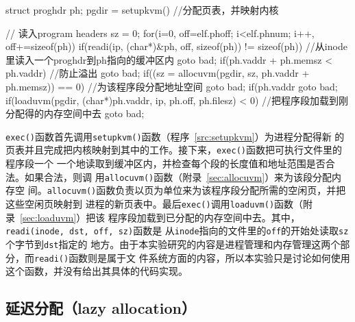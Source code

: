 \documentclass{swfuthesism}
\begin{document}
\begin{listing}
  \begin{codeblock}
\begin{ccode}
  struct proghdr ph;
  pgdir = setupkvm() //分配页表，并映射内核

  // 读入program headers
  sz = 0;
  for(i=0, off=elf.phoff; i<elf.phnum; i++, off+=sizeof(ph)){
    if(readi(ip, (char*)&ph, off, sizeof(ph)) != sizeof(ph)) //从inode里读入一个proghdr到ph指向的缓冲区内
      goto bad;
      if(ph.vaddr + ph.memsz < ph.vaddr) //防止溢出
      goto bad;
    if((sz = allocuvm(pgdir, sz, ph.vaddr + ph.memsz)) == 0) //为该程序段分配地址空间
      goto bad;
    if(ph.vaddr %
      goto bad;
    if(loaduvm(pgdir, (char*)ph.vaddr, ip, ph.off, ph.filesz) < 0) //把程序段加载到刚分配得的内存空间中去
      goto bad;
  }
\end{ccode}
  \end{codeblock}
  \label{src:exec}
\end{listing}

\texttt{exec()}函数首先调用\texttt{setupkvm()}函数（程序~\ref{src:setupkvm}）为进程分配得新
的页表并且完成把内核映射到其中的工作。接下来，\texttt{exec()}函数把可执行文件里的程序段一个
一个地读取到缓冲区内，并检查每个段的长度值和地址范围是否合法。如果合法，则调
用\texttt{allocuvm()}函数（附录~\ref{sec:allocuvm}）来为该段分配内存空
间。\texttt{allocuvm()}函数负责以页为单位来为该程序段分配所需的空闲页，并把这些空闲页映射到
进程的新页表中。最后\texttt{exec()}调用\texttt{loaduvm()}函数（附录~\ref{sec:loaduvm}）把该
程序段加载到已分配的内存空间中去。其中，\texttt{readi(inode, dst, off, sz)}函数是
从\texttt{inode}指向的文件里的\texttt{off}的开始处读取\texttt{sz}个字节到\texttt{dst}指定的
地方。由于本实验研究的内容是进程管理和内存管理这两个部分，而\texttt{readi()}函数则是属于文
件系统方面的内容，所以本实验只是讨论如何使用这个函数，并没有给出其具体的代码实现。

\subsection{延迟分配（lazy allocation）}
\end{document}
